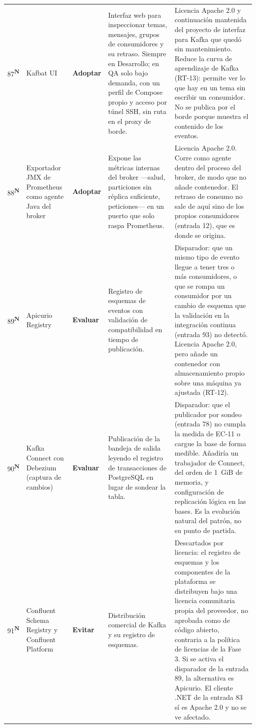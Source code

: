\documentclass[11pt,a4paper]{article}
\newcommand{\adoptar}{\textcolor{ringAdoptar}{\textbf{Adoptar}}}
\newcommand{\evaluar}{\textcolor{ringEvaluar}{\textbf{Evaluar}}}
\newcommand{\evitar}{\textcolor{ringEvitar}{\textbf{Evitar}}}
\newcommand{\nueva}{\textsuperscript{\textcolor{vinotinto}{\scriptsize\bfseries N}}}
\begin{document}
\begin{longtable}{L{0.8cm} L{2.6cm} L{1.6cm} L{4.1cm} L{4.5cm}}
87\nueva & Kafbat UI & \adoptar{} & Interfaz web para inspeccionar temas, mensajes, grupos de consumidores y su retraso. Siempre en Desarrollo; en QA solo bajo demanda, con un perfil de Compose propio y acceso por túnel SSH, sin ruta en el proxy de borde. & Licencia Apache 2.0 y continuación mantenida del proyecto de interfaz para Kafka que quedó sin mantenimiento. Reduce la curva de aprendizaje de Kafka (RT-13): permite ver lo que hay en un tema sin escribir un consumidor. No se publica por el borde porque muestra el contenido de los eventos. \\

88\nueva & Exportador JMX de Prometheus como agente Java del broker & \adoptar{} & Expone las métricas internas del broker ---salud, particiones sin réplica suficiente, peticiones--- en un puerto que solo raspa Prometheus. & Licencia Apache 2.0. Corre como agente dentro del proceso del broker, de modo que no añade contenedor. El retraso de consumo no sale de aquí sino de los propios consumidores (entrada 12), que es donde se origina. \\

89\nueva & Apicurio Registry & \evaluar{} & Registro de esquemas de eventos con validación de compatibilidad en tiempo de publicación. & Disparador: que un mismo tipo de evento llegue a tener tres o más consumidores, o que se rompa un consumidor por un cambio de esquema que la validación en la integración continua (entrada 93) no detectó. Licencia Apache 2.0, pero añade un contenedor con almacenamiento propio sobre una máquina ya ajustada (RT-12). \\

90\nueva & Kafka Connect con Debezium (captura de cambios) & \evaluar{} & Publicación de la bandeja de salida leyendo el registro de transacciones de PostgreSQL en lugar de sondear la tabla. & Disparador: que el publicador por sondeo (entrada 78) no cumpla la medida de EC-11 o cargue la base de forma medible. Añadiría un trabajador de Connect, del orden de 1~GiB de memoria, y configuración de replicación lógica en las bases. Es la evolución natural del patrón, no su punto de partida. \\

91\nueva & Confluent Schema Registry y Confluent Platform & \evitar{} & Distribución comercial de Kafka y su registro de esquemas. & Descartados por licencia: el registro de esquemas y los componentes de la plataforma se distribuyen bajo una licencia comunitaria propia del proveedor, no aprobada como de código abierto, contraria a la política de licencias de la Fase 3. Si se activa el disparador de la entrada 89, la alternativa es Apicurio. El cliente .NET de la entrada 83 sí es Apache 2.0 y no se ve afectado. \\

\end{longtable}
\end{document}
